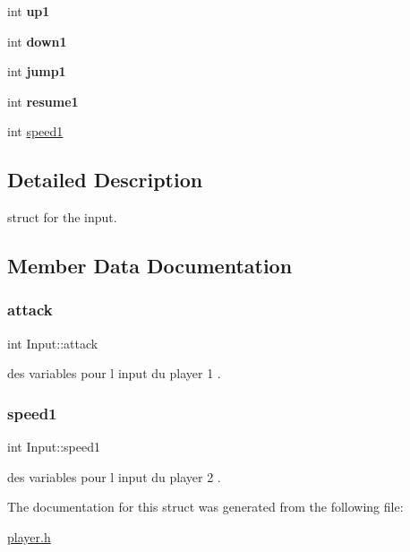 \begin{DoxyCompactItemize}
\mbox{\label{structInput_a81d1cdef76d9cab4874770d94997cb24}} 
int {\bfseries up1}
\item 
\mbox{\label{structInput_ad3fabe676679d49c9c056e34ad659be1}} 
int {\bfseries down1}
\item 
\mbox{\label{structInput_a19c010cf0e9192314788f9d1d239e83a}} 
int {\bfseries jump1}
\item 
\mbox{\label{structInput_a833d20124cf8997b9725032f02f33761}} 
int {\bfseries resume1}
\item 
int \hyperlink{structInput_aca9bc91461dd2179c6a641562c4b929b}{speed1}
\end{DoxyCompactItemize}


\subsection{Detailed Description}
struct for the input. 

\subsection{Member Data Documentation}
\mbox{\label{structInput_a64f7d1faac36dc0a2e8096b7d3c1e7fc}} 
\subsubsection{\texorpdfstring{attack}{attack}}
{\footnotesize\ttfamily int Input\+::attack}

des variables pour l input du player 1 . \mbox{\label{structInput_aca9bc91461dd2179c6a641562c4b929b}} 
\subsubsection{\texorpdfstring{speed1}{speed1}}
{\footnotesize\ttfamily int Input\+::speed1}

des variables pour l input du player 2 . 

The documentation for this struct was generated from the following file\+:\begin{DoxyCompactItemize}
\item 
\hyperlink{player_8h}{player.\+h}\end{DoxyCompactItemize}
